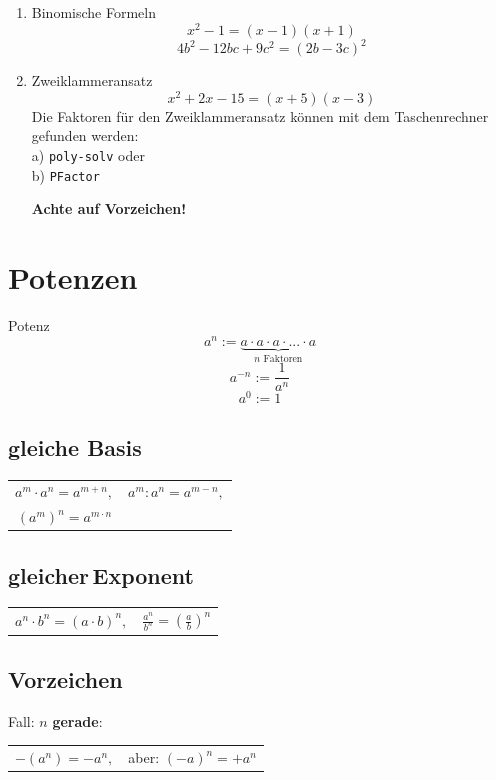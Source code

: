 \begin{multicols}{2}
\begin{enumerate}
\item Binomische Formeln
$$x^2-1 = (x-1)(x+1)$$
$$4b^2 -12bc + 9c^2=(2b-3c)^2$$
\item Zweiklammeransatz
$$x^2+2x-15 = (x+5)(x-3)$$
Die Faktoren für den Zweiklammeransatz können mit dem Taschenrechner
gefunden werden:\\ a) \texttt{poly-solv} 
oder\\ b) \texttt{PFactor} 

\textbf{\color{red}Achte auf Vorzeichen!}
\end{enumerate}




\forceCB
\section*{Potenzen}
\begin{definition*}{Potenz}{}
$$a^n := \underbrace{a\cdot{}a\cdot{}a\cdot{}...\cdot{}a}_{n\textrm{ Faktoren}}$$
$$a^{-n} := \frac1{a^n}$$
  $$a^0 := 1$$
\end{definition*}

\subsection*{gleiche Basis}
\begin{tabular}{cc}
$a^m\cdot{}a^n = a^{m+n},$ & $a^m:a^n=a^{m-n},$ \\
$\left(a^m\right)^n = a^{m\cdot{}n}$ &\\
 \end{tabular} 

\subsection*{gleicher\,Exponent}
\begin{tabular}{cc}
$a^n\cdot{}b^n = (a\cdot{}b)^n,$ & $\frac{a^n}{b^n} =\left(\frac{a}b\right)^n $\\
 \end{tabular}

\subsection*{Vorzeichen}
Fall: $n$ \textbf{gerade}:

\begin{tabular}{cc}
 $-(a^n) = -a^n,$ & aber: $(-a)^n = +a^n$\\
 \end{tabular} 


\end{multicols}
